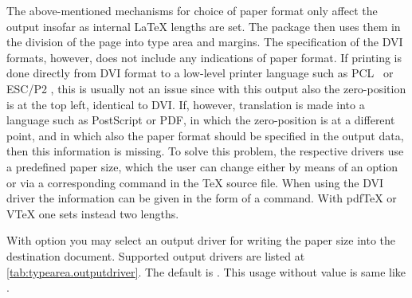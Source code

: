 \begin{Declaration}
\end{Declaration}%
\begin{Explain}%
  The above-mentioned mechanisms for choice of paper format only
  affect the output insofar as internal {\LaTeX} lengths are set. The
   package then uses them in the division of the
  page into type area and margins. 
  The specification of the DVI
  formats, however, does not include any indications of paper
  format. If printing is done directly from DVI format to a low-level
  printer language such as PCL%
  \iffalse%
  \footnote{PCL is the printer language used by HP for its inkjet and
    laser printers.}%
  \fi \ or ESC/P2%
  \iffalse%
  \footnote{ESC/P2 is the printer language used by EPSON for its
    dot-matrix, inkjet and laser printers.}%
  \fi , this is usually not an issue since with this output also the
  zero-position is at the top left, identical to DVI. If, however,
  translation is made into a language such as
  PostScript or PDF, in which the
  zero-position is at a different point, and in which also the paper
  format should be specified in the output data, then this information
  is missing. To solve this problem, the respective drivers use a
  predefined paper size, which the user can change either by means of
  an option or via a corresponding command in the {\TeX} source
  file. When using the DVI driver  the information can be
  given in the form of a  command. With {pdf\TeX} or
  {V\TeX} one sets instead two lengths.
\end{Explain}
With option  you may select an output driver for writing the
paper size into the destination document. Supported output drivers are listed
at \autoref{tab:typearea.outputdriver}. The
default is . This usage
without value is same like .
%
